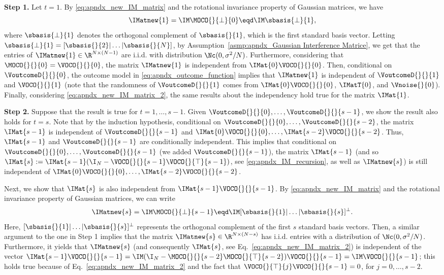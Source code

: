 \textbf{Step 1.} Let $t=1$. By \eqref{eq:apndx_new_IM_matrix} and the rotational invariance property of Gaussian matrices, we have
% 
\begin{equation}
    \label{eq:apndx_proof_new_IM_distribution_1}
    \IMatnew{1} = \IM \MOCO{}{\perp}{0} \eqd \IM \sbasis{\perp}{1},
\end{equation}
% 
where $\sbasis{\perp}{1}$ denotes the orthogonal complement of $\sbasis{}{1}$, which is the first standard basis vector. Letting $\sbasis{\perp}{1} = [\sbasis{}{2}|\ldots|\sbasis{}{N}]$, by Assumption~\ref{asmp:apndx_Gaussian Interference Matrice}, we get that the entries of $\IMatnew{1} \in \R^{N \times (N-1)}$ are i.i.d. with distribution $\Nc(0,{\sigma^2}/ {N})$. Furthermore, considering that $\MOCO{}{}{0} = \VOCO{}{}{0}$, the matrix $\IMatnew{1}$ is independent from $\IMat{0}\VOCO{}{}{0}$. Then, conditional on $\VoutcomeD{}{}{0}$, the outcome model in \eqref{eq:apndx_outcome_function} implies that $\IMatnew{1}$ is independent of $\VoutcomeD{}{}{1}$ and $\VOCO{}{}{1}$ (note that the randomness of $\VoutcomeD{}{}{1}$ comes from $\IMat{0}\VOCO{}{}{0}$, $\IMatT{0}$, and $\Vnoise{}{0}$). Finally, considering \eqref{eq:apndx_new_IM_matrix_2}, the same results about the independency hold true for the matrix $\IMat{1}$.

\textbf{Step 2.} Suppose that the result is true for $t=1, \ldots, s-1$. Given $\VoutcomeD{}{}{0}, \ldots, \VoutcomeD{}{}{s-1}$, we show the result also holds for $t=s$. Note that by the induction hypothesis, conditional on $\VoutcomeD{}{}{0}, \ldots, \VoutcomeD{}{}{s-2}$, the matrix $\IMat{s-1}$ is independent of $\VoutcomeD{}{}{s-1}$ and $\IMat{0}\VOCO{}{}{0}, \ldots, \IMat{s-2}\VOCO{}{}{s-2}$. Thus, $\IMat{s-1}$ and $\VoutcomeD{}{}{s-1}$ are conditionally independent. This implies that conditional on $\VoutcomeD{}{}{0}, \ldots, \VoutcomeD{}{}{s-1}$ (we added $\VoutcomeD{}{}{s-1}$), the matrix $\IMat{s-1}$ (and so $\IMat{s} := \IMat{s-1} (\I_N - \VOCO{}{}{s-1}\VOCO{}{\top}{s-1})$, see \eqref{eq:apndx_IM_recursion}, as well as $\IMatnew{s}$) is still independent of $\IMat{0}\VOCO{}{}{0}, \ldots, \IMat{s-2}\VOCO{}{}{s-2}$.

Next, we show that $\IMat{s}$ is also independent from $\IMat{s-1}\VOCO{}{}{s-1}$. By \eqref{eq:apndx_new_IM_matrix} and the rotational invariance property of Gaussian matrices, we can write
% 
\begin{equation*}
    \IMatnew{s} = \IM \MOCO{}{\perp}{s-1} \eqd \IM [\sbasis{}{1}| \ldots| \sbasis{}{s}]^\perp.
\end{equation*}
% 
Here, $[\sbasis{}{1}| \ldots| \sbasis{}{s}]^\perp$ represents the orthogonal complement of the first $s$ standard basis vectors. Then, a similar argument to the one in Step 1 implies that the matrix $\IMatnew{s} \in \R^{N\times (N-s)}$ has i.i.d. entries with a distribution of $\Nc(0,{\sigma^2}/ {N})$. Furthermore, it yields that $\IMatnew{s}$ (and consequently $\IMat{s}$, see Eq.~\eqref{eq:apndx_new_IM_matrix_2}) is independent of the vector $\IMat{s-1}\VOCO{}{}{s-1} = \IM (\I_N - \MOCO{}{}{s-2} \MOCO{}{\top}{s-2}) \VOCO{}{}{s-1} = \IM \VOCO{}{}{s-1}$; this holds true because of Eq.~\eqref{eq:apndx_new_IM_matrix_2} and the fact that $\VOCO{}{\top}{j} \VOCO{}{}{s-1} =0$, for $j = 0, \ldots, s-2$. 

